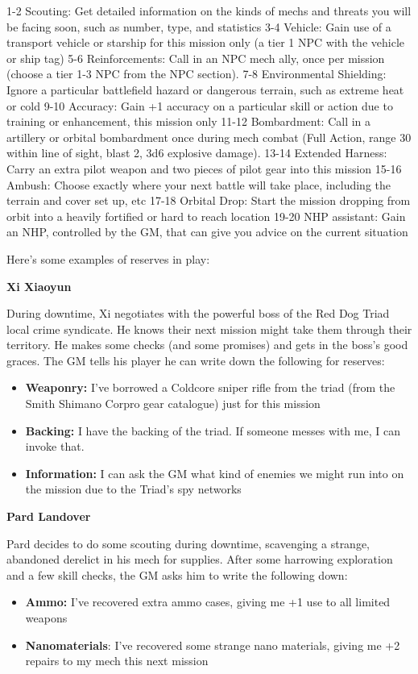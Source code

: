  1-2       Scouting: Get detailed information on the kinds of mechs and threats you will be
           facing soon, such as number, type, and statistics
 3-4       Vehicle: Gain use of a transport vehicle or starship for this mission only (a tier 1 NPC
           with the vehicle or ship tag)
 5-6       Reinforcements: Call in an NPC mech ally, once per mission (choose a tier 1-3 NPC
           from the NPC section).
 7-8       Environmental Shielding: Ignore a particular battlefield hazard or dangerous terrain,
           such as extreme heat or cold
 9-10      Accuracy: Gain +1 accuracy on a particular skill or action due to training or
           enhancement, this mission only
 11-12     Bombardment: Call in a artillery or orbital bombardment once during mech combat
           (Full Action, range 30 within line of sight, blast 2, 3d6 explosive damage).
 13-14     Extended Harness: Carry an extra pilot weapon and two pieces of pilot gear into this
           mission
 15-16     Ambush: Choose exactly where your next battle will take place, including the terrain
           and cover set up, etc
 17-18     Orbital Drop: Start the mission dropping from orbit into a heavily fortified or hard to
           reach location
 19-20     NHP assistant: Gain an NHP, controlled by the GM, that can give you advice on the
           current situation

Here’s some examples of reserves in play:

\textbf{Xi Xiaoyun}

During downtime, Xi negotiates with the powerful boss of the Red Dog Triad local crime syndicate. He knows their next mission might take them through their territory. He makes some checks (and some promises) and gets in the boss’s good graces. The GM tells his player he can write down the following for reserves:
\begin{itemize}
\item \textbf{Weaponry:} I’ve borrowed a Coldcore sniper rifle from the triad (from the Smith Shimano Corpro gear catalogue) just for this mission
\item \textbf{Backing:} I have the backing of the triad. If someone messes with me, I can invoke that.
\item \textbf{Information:} I can ask the GM what kind of enemies we might run into on the mission due to the Triad’s spy networks
\end{itemize}  

\textbf{Pard Landover}

Pard decides to do some scouting during downtime, scavenging a strange, abandoned derelict in his mech for supplies. After some harrowing exploration and a few skill checks, the GM asks him to write the following down:
\begin{itemize}
\item \textbf{Ammo:} I’ve recovered extra ammo cases, giving me +1 use to all limited weapons
\item \textbf{Nanomaterials}: I’ve recovered some strange nano materials, giving me +2 repairs to my mech this next mission
\end{itemize}  

